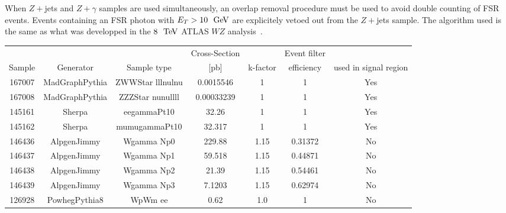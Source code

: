 
When $Z+$jets and $Z+\gamma$ samples are used simultaneously, an overlap removal procedure must be used to avoid double counting of FSR events. Events containing an FSR photon with $E_{T}>10~\GeV$ are explicitely vetoed out from the $Z+$jets sample. The algorithm used is the same as what was developped in the $8~\TeV$ ATLAS $WZ$ analysis~\cite{Anger:1663539}.


\begin{table}[ht!]
  \centering
  \begin{footnotesize}
\begin{tabular}{c|c|c|c|c|c|c}
\hline
    &  &  & Cross-Section &  & Event filter  \\
  Sample  & Generator & Sample type & [pb] & k-factor &  efficiency  & used in signal region\\
\hline \hline
167007 & MadGraphPythia & ZWWStar lllnulnu  &  0.0015546  &  1  &  1 & Yes \\
167008 & MadGraphPythia & ZZZStar nunullll  &  0.00033239  &  1  &  1 & Yes \\
145161 & Sherpa & eegammaPt10  &  32.26  &  1  &  1 & Yes \\
145162 & Sherpa & mumugammaPt10  &  32.317  &  1  &  1 & Yes \\
146436 & AlpgenJimmy & Wgamma Np0 & 229.88 & 1.15 & 0.31372 & No \\
146437 & AlpgenJimmy & Wgamma Np1 & 59.518 & 1.15 & 0.44871 & No \\
146438 & AlpgenJimmy & Wgamma Np2 & 21.39  & 1.15 & 0.54461 & No \\
146439 & AlpgenJimmy & Wgamma Np3 & 7.1203 & 1.15 & 0.62974 & No \\
126928 & PowhegPythia8& WpWm ee  &  0.62  &  1.0  &  1 & No  \\

\end{tabular}
\end{footnotesize}
\end{table}
